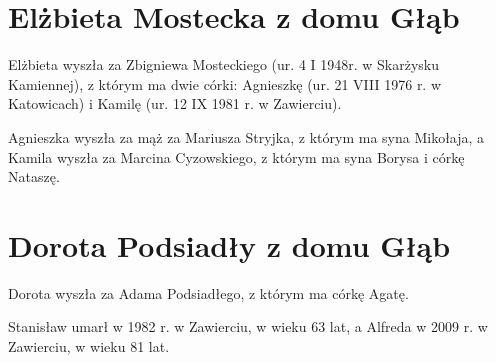 \newpage 
\section{Elżbieta Mostecka z domu Głąb}

Elżbieta wyszła za Zbigniewa Mosteckiego (ur. 4 I 1948r. w Skarżysku Kamiennej), z którym ma dwie córki: Agnieszkę (ur. 21 VIII 1976 r. w Katowicach) i Kamilę (ur. 12 IX 1981 r. w Zawierciu).

Agnieszka wyszła za mąż za Mariusza Stryjka, z którym ma syna Mikołaja, a Kamila wyszła za Marcina Cyzowskiego, z którym ma syna Borysa i córkę Nataszę.




\section{Dorota Podsiadły z domu Głąb}

Dorota wyszła za Adama Podsiadłego, z którym ma córkę Agatę.

Stanisław umarł w 1982 r. w Zawierciu, w wieku 63 lat, a Alfreda w 2009 r. w Zawierciu, w wieku 81 lat.



